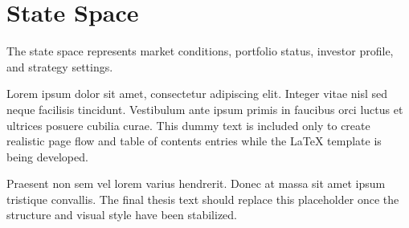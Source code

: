 \section{State Space}

The state space represents market conditions, portfolio status, investor profile, and strategy settings.

Lorem ipsum dolor sit amet, consectetur adipiscing elit. Integer vitae nisl sed neque facilisis tincidunt. Vestibulum ante ipsum primis in faucibus orci luctus et ultrices posuere cubilia curae. This dummy text is included only to create realistic page flow and table of contents entries while the LaTeX template is being developed.

Praesent non sem vel lorem varius hendrerit. Donec at massa sit amet ipsum tristique convallis. The final thesis text should replace this placeholder once the structure and visual style have been stabilized.

